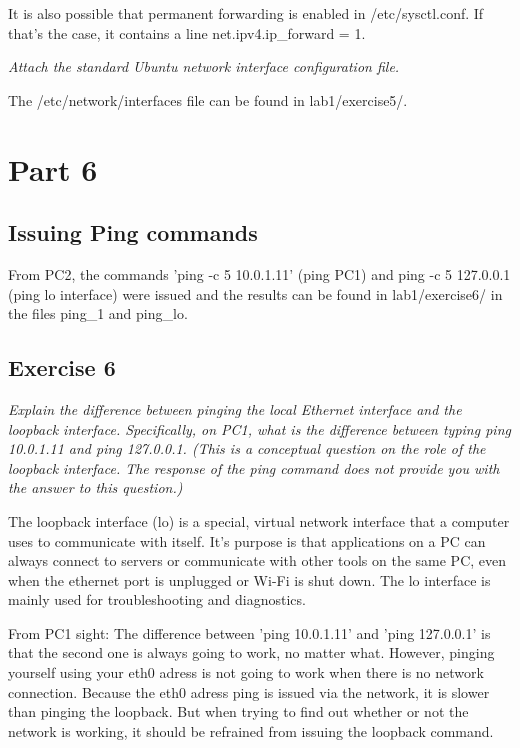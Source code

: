 \documentclass[a4paper, 11pt]{article}
\begin{document}
It is also possible that permanent forwarding is enabled in /etc/sysctl.conf. If that's the case, it contains a line 
net.ipv4.ip\_forward = 1.

\emph{Attach the standard Ubuntu network interface configuration file.}

The /etc/network/interfaces file can be found in lab1/exercise5/.

\section{Part 6}

\subsection{Issuing Ping commands}

From PC2, the commands 'ping -c 5 10.0.1.11' (ping PC1) and ping -c 5 127.0.0.1 (ping lo interface) were issued and
the results can be found in lab1/exercise6/ in the files ping\_1 and ping\_lo.

\subsection{Exercise 6}

\emph{Explain the difference between pinging the local Ethernet interface and the loopback interface. Specifically, on PC1, what is the difference between typing ping 10.0.1.11 and ping 127.0.0.1.
(This is a conceptual question on the role of the loopback interface. The response of the ping command does not provide you with the answer to this question.)}
 
The loopback interface (lo) is a special, virtual network interface that a computer uses to communicate with itself. It's purpose is that applications on a PC can always
connect to servers or communicate with other tools on the same PC, even when the ethernet port is unplugged or Wi-Fi is shut down. The lo interface is mainly used for 
troubleshooting and diagnostics.
 
From PC1 sight: The difference between 'ping 10.0.1.11' and 'ping 127.0.0.1' is that the second one is always going to work, no matter what. However, pinging yourself using your eth0 adress is not 
going to work when there is no network connection. Because the eth0 adress ping is issued via the network, it is slower than pinging the loopback. But when trying to find out whether or not the network is working, it should be refrained from issuing the loopback command.
\end{document}
